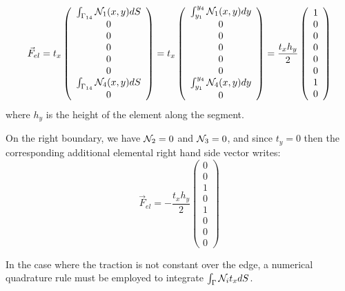 \[
\vec{F}_{el}=
t_x
\left(
\begin{array}{c}
\int_{\Gamma_{14}}  {\mathcal{N}}_1(x,y)  dS\\
0 \\
0 \\ 0 \\ 0 \\ 0 \\
\int_{\Gamma_{14}} {\mathcal{N}}_4(x,y)  dS\\
0
\end{array}
\right)
=
t_x
\left(
\begin{array}{c}
\int_{y_1}^{y_4} {\mathcal{N}}_1(x,y) dy\\
0 \\
0 \\ 0 \\ 0 \\ 0 \\
\int_{y_1}^{y_4} {\mathcal{N}}_4(x,y) dy\\
0
\end{array}
\right)
=
\frac{t_x h_y}{2}
\left(
\begin{array}{c}
1 \\
0 \\
0 \\ 0 \\ 0 \\ 0 \\
1 \\
0
\end{array}
\right)
\]
where $h_y$ is the height of the element along the segment. 



On the right boundary, we have ${\mathcal{N}}_2=0$ and ${\mathcal{N}}_3=0$, and since $t_y=0$ then 
the corresponding additional elemental right hand side vector writes:
\[
\vec{F}_{el} =
-\frac{t_x h_y}{2}
\left(
\begin{array}{c}
0\\
0\\
1 \\
0\\
1 \\
0\\
0\\
0
\end{array}
\right)
\] 

In the case where the traction is not constant over the edge, a numerical quadrature rule 
must be employed to integrate $\int_\Gamma {\mathcal{N}}_i t_x dS$.



